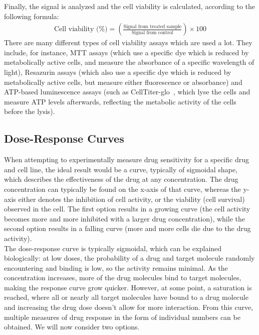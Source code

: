 Finally, the signal is analyzed and the cell viability is calculated, according to the following formula:
\begin{align}
	\text{Cell viability (\%)} = \left(\frac{\text{Signal from treated sample}}{\text{Signal from control}}\right)\times 100
\end{align}
There are many different types of cell viability assays which are used a lot. They include, for instance, MTT assays (which use a specific dye which is reduced by metabolically active cells, and measure the absorbance of a specific wavelength of light), Resazurin assays (which also use a specific dye which is reduced by metabolically active cells, but measure either fluorescence or absorbance) and ATP-based luminescence assays (such as CellTiter-glo~\cite{celltiterglo}, which lyse the cells and measure ATP levels afterwards, reflecting the metabolic activity of the cells before the lysis).

\subsection{Dose-Response Curves}\label{subsec:ds_dose_response_curve}
When attempting to experimentally measure drug sensitivity for a specific drug and cell line, the ideal result would be a curve, typically of sigmoidal shape, which describes the effectiveness of the drug at any concentration. The drug concentration can typically be found on the x-axis of that curve, whereas the y-axis either denotes the inhibition of cell activity, or the viability (cell survival) observed in the cell. The first option results in a growing curve (the cell activity becomes more and more inhibited with a larger drug concentration), while the second option results in a falling curve (more and more cells die due to the drug activity).\\
The dose-response curve is typically sigmoidal, which can be explained biologically: at low doses, the probability of a drug and target molecule randomly encountering and binding is low, so the activity remains minimal. As the concentration increases, more of the drug molecules bind to target molecules, making the response curve grow quicker. However, at some point, a saturation is reached, where all or nearly all target molecules have bound to a drug molecule and increasing the drug dose doesn't allow for more interaction. From this curve, multiple measures of drug response in the form of individual numbers can be obtained. We will now consider two options.

